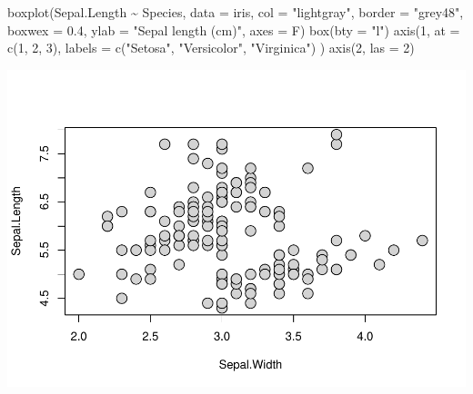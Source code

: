 \documentclass[
]{book}
\newenvironment{Shaded}{\begin{snugshade}}{\end{snugshade}}
\newcommand{\AttributeTok}[1]{\textcolor[rgb]{0.77,0.63,0.00}{#1}}
\newcommand{\DecValTok}[1]{\textcolor[rgb]{0.00,0.00,0.81}{#1}}
\newcommand{\FloatTok}[1]{\textcolor[rgb]{0.00,0.00,0.81}{#1}}
\newcommand{\FunctionTok}[1]{\textcolor[rgb]{0.00,0.00,0.00}{#1}}
\newcommand{\NormalTok}[1]{#1}
\newcommand{\SpecialCharTok}[1]{\textcolor[rgb]{0.00,0.00,0.00}{#1}}
\newcommand{\StringTok}[1]{\textcolor[rgb]{0.31,0.60,0.02}{#1}}
\begin{document}
\begin{Shaded}
\begin{Highlighting}[]
\FunctionTok{boxplot}\NormalTok{(Sepal.Length }\SpecialCharTok{\textasciitilde{}}\NormalTok{ Species, }\AttributeTok{data =}\NormalTok{ iris,}
        \AttributeTok{col =} \StringTok{"lightgray"}\NormalTok{, }\AttributeTok{border =} \StringTok{"grey48"}\NormalTok{,}
        \AttributeTok{boxwex =} \FloatTok{0.4}\NormalTok{, }\AttributeTok{ylab =} \StringTok{"Sepal length (cm)"}\NormalTok{,}
        \AttributeTok{axes =}\NormalTok{ F)}
\FunctionTok{box}\NormalTok{(}\AttributeTok{bty =} \StringTok{"l"}\NormalTok{)}
\FunctionTok{axis}\NormalTok{(}\DecValTok{1}\NormalTok{, }\AttributeTok{at =} \FunctionTok{c}\NormalTok{(}\DecValTok{1}\NormalTok{, }\DecValTok{2}\NormalTok{, }\DecValTok{3}\NormalTok{), }\AttributeTok{labels =} \FunctionTok{c}\NormalTok{(}\StringTok{"Setosa"}\NormalTok{, }\StringTok{"Versicolor"}\NormalTok{, }\StringTok{"Virginica"}\NormalTok{) )}
\FunctionTok{axis}\NormalTok{(}\DecValTok{2}\NormalTok{, }\AttributeTok{las =} \DecValTok{2}\NormalTok{)}
\end{Highlighting}
\end{Shaded}

\begin{center}\includegraphics{biostats_files/figure-latex/unnamed-chunk-127-1} \end{center}
\end{document}
